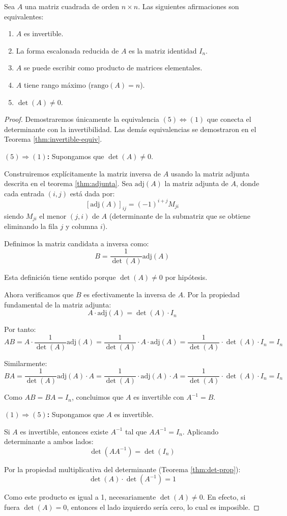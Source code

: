 \begin{theorem}\label{thm:invertible-equiv-v2}
Sea $A$ una matriz cuadrada de orden $n \times n$. Las siguientes afirmaciones son equivalentes:
\begin{enumerate}
    \item $A$ es invertible.
    \item La forma escalonada reducida de $A$ es la matriz identidad $I_n$.
    \item $A$ se puede escribir como producto de matrices elementales.
    \item $A$ tiene rango máximo ($\text{rango}(A) = n$).
    \item $\det(A) \neq 0$.
\end{enumerate}

\begin{proof}
Demostraremos únicamente la equivalencia $(5) \Leftrightarrow (1)$ que conecta el determinante con la invertibilidad. Las demás equivalencias se demostraron en el Teorema \ref{thm:invertible-equiv}.

\textbf{$(5) \Rightarrow (1)$:} Supongamos que $\det(A) \neq 0$.

Construiremos explícitamente la matriz inversa de $A$ usando la matriz adjunta descrita en el teorema \ref{thm:adjunta}. Sea $\text{adj}(A)$ la matriz adjunta de $A$, donde cada entrada $(i,j)$ está dada por:
\[[\text{adj}(A)]_{ij} = (-1)^{i+j} M_{ji}\]
siendo $M_{ji}$ el menor $(j,i)$ de $A$ (determinante de la submatriz que se obtiene eliminando la fila $j$ y columna $i$).

Definimos la matriz candidata a inversa como:
\[B = \frac{1}{\det(A)} \text{adj}(A)\]

Esta definición tiene sentido porque $\det(A) \neq 0$ por hipótesis.

Ahora verificamos que $B$ es efectivamente la inversa de $A$. Por la propiedad fundamental de la matriz adjunta:
\[A \cdot \text{adj}(A) = \det(A) \cdot I_n\]

Por tanto:
\[AB = A \cdot \frac{1}{\det(A)} \text{adj}(A) = \frac{1}{\det(A)} \cdot A \cdot \text{adj}(A) = \frac{1}{\det(A)} \cdot \det(A) \cdot I_n = I_n\]

Similarmente:
\[BA = \frac{1}{\det(A)} \text{adj}(A) \cdot A = \frac{1}{\det(A)} \cdot \text{adj}(A) \cdot A = \frac{1}{\det(A)} \cdot \det(A) \cdot I_n = I_n\]

Como $AB = BA = I_n$, concluimos que $A$ es invertible con $A^{-1} = B$.

\textbf{$(1) \Rightarrow (5)$:} Supongamos que $A$ es invertible.

Si $A$ es invertible, entonces existe $A^{-1}$ tal que $AA^{-1} = I_n$. Aplicando determinante a ambos lados:
\[\det(AA^{-1}) = \det(I_n)\]

Por la propiedad multiplicativa del determinante (Teorema \ref{thm:det-prop}):
\[\det(A) \cdot \det(A^{-1}) = 1\]

Como este producto es igual a 1, necesariamente $\det(A) \neq 0$. En efecto, si fuera $\det(A) = 0$, entonces el lado izquierdo sería cero, lo cual es imposible.
\end{proof}
\end{theorem}
